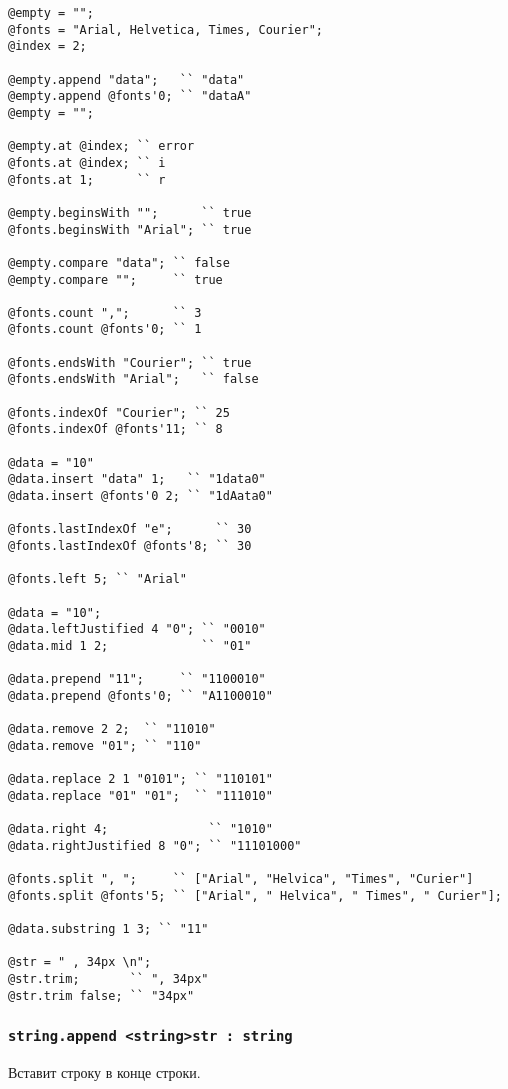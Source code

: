 \begin{lstlisting}[caption=Методы класса string, label=stringmethods]
@empty = "";
@fonts = "Arial, Helvetica, Times, Courier";
@index = 2;

@empty.append "data";   `` "data"
@empty.append @fonts'0; `` "dataA"
@empty = "";

@empty.at @index; `` error
@fonts.at @index; `` i
@fonts.at 1;	  `` r

@empty.beginsWith "";      `` true
@fonts.beginsWith "Arial"; `` true

@empty.compare "data"; `` false
@empty.compare "";     `` true

@fonts.count ",";      `` 3
@fonts.count @fonts'0; `` 1

@fonts.endsWith "Courier"; `` true
@fonts.endsWith "Arial";   `` false

@fonts.indexOf "Courier"; `` 25
@fonts.indexOf @fonts'11; `` 8

@data = "10"
@data.insert "data" 1;   `` "1data0"
@data.insert @fonts'0 2; `` "1dAata0"

@fonts.lastIndexOf "e";      `` 30
@fonts.lastIndexOf @fonts'8; `` 30

@fonts.left 5; `` "Arial"

@data = "10";
@data.leftJustified 4 "0"; `` "0010"
@data.mid 1 2;             `` "01"

@data.prepend "11";     `` "1100010"
@data.prepend @fonts'0; `` "A1100010"

@data.remove 2 2;  `` "11010"
@data.remove "01"; `` "110"

@data.replace 2 1 "0101"; `` "110101"
@data.replace "01" "01";  `` "111010"

@data.right 4; 				`` "1010"
@data.rightJustified 8 "0"; `` "11101000"

@fonts.split ", ";     `` ["Arial", "Helvica", "Times", "Curier"]
@fonts.split @fonts'5; `` ["Arial", " Helvica", " Times", " Curier"];

@data.substring 1 3; `` "11"

@str = " , 34px \n";
@str.trim;       `` ", 34px"
@str.trim false; `` "34px"
\end{lstlisting}

\subsubsection{\lstinline|string.append <string>str : string|}

Вставит строку  в конце строки.

